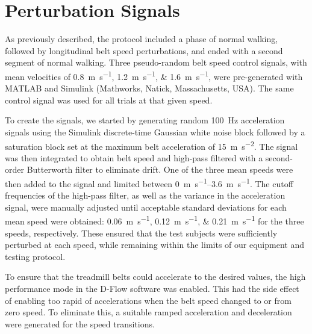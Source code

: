 \documentclass[fleqn,10pt]{wlpeerj}
\begin{document}
\section*{Perturbation Signals}
%
As previously described, the protocol included a phase of normal walking,
followed by longitudinal belt speed perturbations, and ended with a second
segment of normal walking. Three pseudo-random belt speed control signals, with
mean velocities of \SIlist{0.8;1.2;1.6}{\meter\per\second}, were pre-generated
with MATLAB and Simulink (Mathworks, Natick, Massachusetts, USA).  The same
control signal was used for all trials at that given speed.

To create the signals, we started by generating random 100~\si{\hertz}
acceleration signals using the Simulink discrete-time Gaussian white noise
block followed by a saturation block set at the maximum belt acceleration of
15~\si{\meter\per\second\squared}. The signal was then integrated to obtain
belt speed and high-pass filtered with a second-order Butterworth filter to
eliminate drift. One of the three mean speeds were then added to the signal and
limited between \SIrange{0}{3.6}{\meter\per\second}. The cutoff frequencies of
the high-pass filter, as well as the variance in the acceleration signal, were
manually adjusted until acceptable standard deviations for each mean speed were
obtained: \SIlist{0.06;0.12;0.21}{\meter\per\second} for the three speeds,
respectively. These ensured that the test subjects were sufficiently perturbed
at each speed, while remaining within the limits of our equipment and testing
protocol.

To ensure that the treadmill belts could accelerate to the desired values, the
high performance mode in the D-Flow software was enabled. This had the side
effect of enabling too rapid of accelerations when the belt speed changed to or
from zero speed. To eliminate this, a suitable ramped acceleration and
deceleration were generated for the speed transitions.
\end{document}
